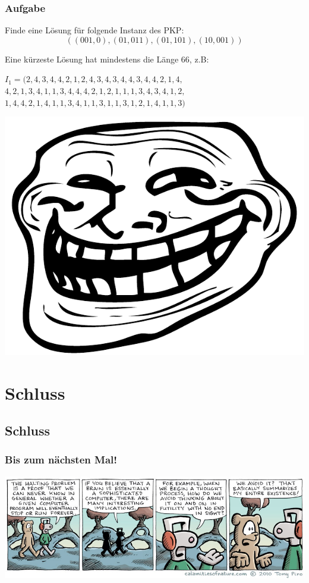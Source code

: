 \begin{frame}
\frametitle{Aufgabe}
Finde eine Lösung für folgende Instanz des PKP:
$$ ((001,0),(01,011),(01,101),(10,001)) $$

\invincible
\pause

Eine kürzeste Lösung hat mindestens die Länge 66, z.B:
\begin{center}
$ I_1 = (2, 4, 3, 4, 4, 2, 1, 2, 4, 3, 4, 3, 4, 4, 3, 4, 4, 2, 1, 4,$ \\
$4, 2, 1, 3, 4, 1, 1, 3, 4, 4, 4, 2, 1, 2, 1, 1, 1, 3, 4, 3, 4, 1, 2,$ \\
$1, 4, 4, 2, 1, 4, 1, 1, 3, 4, 1, 1, 3, 1, 1, 3, 1, 2, 1, 4, 1, 1, 3)$
\end{center}

\pause

\includegraphics{images/trollface}

\vincible

\end{frame}

\section{Schluss}
\subsection{Schluss}
\begin{frame}
	\frametitle{Bis zum nächsten Mal!}
    \begin{center}
        \includegraphics[width=\textwidth]{images/halting.jpg}
    \end{center}
\end{frame}


